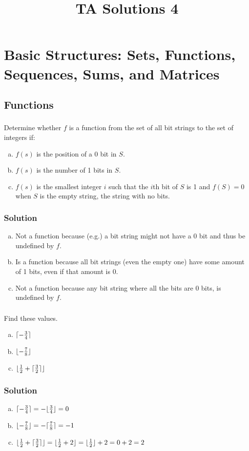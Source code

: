 \documentclass[11pt,a4paper,multicol]{article}
\newcommand{\chapter}[2]{%
\setcounter{section}{#1}%
\addtocounter{section}{-1}%
\section{#2}%
}
\newcommand{\subchapter}[2]{%
\setcounter{subsection}{#1}%
\addtocounter{subsection}{-1}%
\subsection{#2}%
}
\newcommand{\problem}[1]{%
\setcounter{subsubsection}{#1}%
\addtocounter{subsubsection}{-1}%
\subsubsection{\hfill}%
}
\newenvironment{subproblem}
	{\begin{enumerate}[a)]}
	{\end{enumerate}}
\newcommand{\skipitem}{\addtocounter{enumi}{1}}
\newcommand{\solution}{%
\subsubsection*{Solution}%
}
\DeclarePairedDelimiter{\ceil}{\lceil}{\rceil}
\DeclarePairedDelimiter{\floor}{\lfloor}{\rfloor}
\begin{document}
\title{TA Solutions 4}
\date{}
\author{}
\maketitle

\chapter{2}{Basic Structures: Sets, Functions, Sequences, Sums, and Matrices}
	\subchapter{3}{Functions}

		\problem{3}
			Determine whether $f$ is a function from the set of all bit strings to the set of integers if:
			\begin{subproblem}
				\item $f(s)$ is the position of a 0 bit in $S$.
				\item $f(s)$ is the number of 1 bits in $S$.
				\item $f(s)$ is the smallest integer $i$ such that the $i$th bit of $S$ is 1 and $f(S) = 0$ when $S$ is the empty string, the string with no bits.
			\end{subproblem}
		\solution{}
			\begin{subproblem}
				\item Not a function because (e.g.) a bit string might not have a 0 bit and thus be undefined by $f$.
				\item Is a function because all bit strings (even the empty one) have some amount of 1 bits, even if that amount is 0.
				\item Not a function because any bit string where all the bits are 0 bits, is undefined by $f$.
			\end{subproblem}

		\problem{9}
			Find these values.
			\begin{subproblem}
				\skipitem
				\skipitem
				\item $\ceil{-\frac{3}{4}}$
				\item $\floor{-\frac{7}{8}}$
				\skipitem
				\skipitem
				\item $\floor{\frac{1}{2} + \ceil{\frac{3}{2}}}$
			\end{subproblem}
		\solution{}
			\begin{subproblem}
				\skipitem
				\skipitem
				\item $\ceil{-\frac{3}{4}} = - \floor{\frac{3}{4}} = 0$
				\item $\floor{-\frac{7}{8}} = - \ceil{\frac{7}{8}} = -1$
				\skipitem
				\skipitem
				\item $\floor{\frac{1}{2} + \ceil{\frac{3}{2}}} = \floor{\frac{1}{2} + 2} = \floor{\frac{1}{2}} + 2 = 0 + 2 = 2$
			\end{subproblem}
\end{document}
